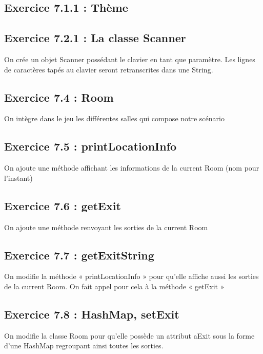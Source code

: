 \documentclass[twoside,french]{report}
\begin{document}
\subsection*{Exercice 7.1.1 : Thème}

\subsection*{Exercice 7.2.1 : La classe Scanner}

On crée un objet Scanner possédant le clavier en tant que paramètre. Les lignes de caractères tapés au clavier seront retranscrites dans une String.\\

\subsection*{Exercice 7.4 : Room}

On intègre dans le jeu les différentes salles qui compose notre scénario\\

\subsection*{Exercice 7.5 : printLocationInfo}

On ajoute une méthode affichant les informations de la current Room (nom pour l’instant)\\


\subsection*{Exercice 7.6 : getExit}

On ajoute une méthode renvoyant les sorties de la current Room

\subsection*{Exercice 7.7 : getExitString}

On modifie la méthode « printLocationInfo » pour qu’elle affiche aussi les sorties de la current Room. On fait appel pour cela à la méthode «  getExit »

\subsection*{Exercice 7.8 : HashMap, setExit}

On modifie la classe Room pour qu’elle possède un attribut aExit sous la forme d’une HashMap regroupant ainsi toutes les sorties. 
\end{document}
